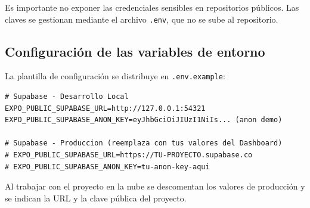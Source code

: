 \begin{table}[H]
  \centering
  \caption{Datos de configuraci\'on del proyecto Supabase}
\end{table}

Es importante no exponer las credenciales sensibles en repositorios
p\'ublicos. Las claves se gestionan mediante el archivo \texttt{.env},
que no se sube al repositorio.

\subsection{Configuraci\'on de las variables de entorno}

La plantilla de configuraci\'on se distribuye en \texttt{.env.example}:

\begin{lstlisting}
# Supabase - Desarrollo Local
EXPO_PUBLIC_SUPABASE_URL=http://127.0.0.1:54321
EXPO_PUBLIC_SUPABASE_ANON_KEY=eyJhbGciOiJIUzI1NiIs... (anon demo)

# Supabase - Produccion (reemplaza con tus valores del Dashboard)
# EXPO_PUBLIC_SUPABASE_URL=https://TU-PROYECTO.supabase.co
# EXPO_PUBLIC_SUPABASE_ANON_KEY=tu-anon-key-aqui
\end{lstlisting}

Al trabajar con el proyecto en la nube se descomentan los valores de
producci\'on y se indican la URL y la clave p\'ublica del proyecto.

